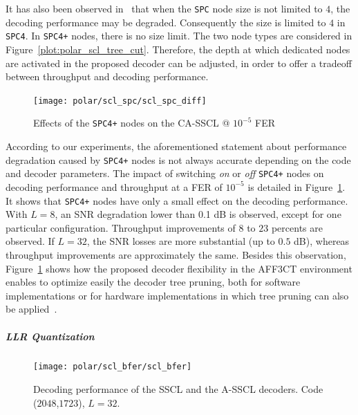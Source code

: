 It has also been observed in~\cite{Sarkis2016} that when the \texttt{SPC} node
size is not limited to $4$, the decoding performance may be degraded.
Consequently the size is limited to $4$ in \texttt{SPC4}. In \texttt{SPC4+}
nodes, there is no size limit. The two node types are considered in
Figure~\ref{plot:polar_scl_tree_cut}. Therefore, the depth at which dedicated
nodes are activated in the proposed decoder can be adjusted, in order to offer a
tradeoff between throughput and decoding performance.

\begin{figure}
  \centering
  \texttt{[image: polar/scl\_spc/scl\_spc\_diff]}
  \caption{Effects of the \texttt{SPC4+} nodes on the CA-SSCL @ $10^{-5}$ FER}
  \label{fig:polar_scl_spc}
\end{figure}

According to our experiments, the aforementioned statement about performance
degradation caused by \texttt{SPC4+} nodes is not always accurate depending on
the code and decoder parameters. The impact of switching \textit{on} or
\textit{off} \texttt{SPC4+} nodes on decoding performance and throughput at a
FER of $10^{-5}$ is detailed in Figure~\ref{fig:polar_scl_spc}. It shows that
\texttt{SPC4+} nodes have only a small effect on the decoding performance. With
$L=8$, an SNR degradation lower than 0.1 dB is observed, except for one
particular configuration. Throughput improvements of $8$ to $23$ percents are
observed. If $L=32$, the SNR losses are more substantial (up to $0.5$ dB),
whereas throughput improvements are approximately the same. Besides this
observation, Figure~\ref{fig:polar_scl_spc} shows how the proposed decoder
flexibility in the AFF3CT environment enables to optimize easily the decoder
tree pruning, both for software implementations or for hardware implementations
in which tree pruning can also be applied~\cite{Lin2014}.

\subparagraph{LLR Quantization}

\begin{figure}
  \centering
  \texttt{[image: polar/scl\_bfer/scl\_bfer]}
  \caption{Decoding performance of the SSCL and the A-SSCL decoders.
    Code ($2048$,$1723$), $L=32$.}
  \label{plot:polar_scl_bfer}
\end{figure}

